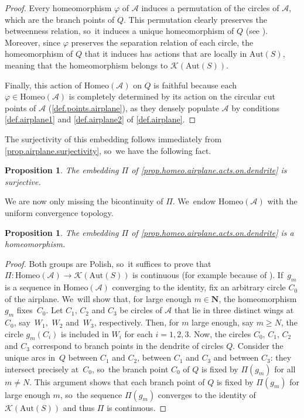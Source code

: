 \documentclass[JEP,XML,SOM,Unicode,NoFloatCountersInSection,published]{cedram}
\theoremstyle{plain}
\newtheorem{proposition}[theorem]{Proposition}
\theoremstyle{definition}
\theoremstyle{remark}
\newcommand{\Aut}{\mathrm{Aut}}
\newcommand{\Homeo}{\mathrm{Homeo}}
\newcommand{\A}{\mathcal{A}}
\newcommand{\K}{\mathcal{K}}
\begin{document}
\begin{proof}
Every homeomorphism $\varphi$ of $\A$ induces a permutation of the circles of $\A$, which are the branch points of $Q$.
This permutation clearly preserves the betweenness relation, so~it induces a unique homeomorphism of $Q$ (see \cite[Prop.\,2.4]{Kaleidoscopic}).
Moreover, since $\varphi$ preserves the separation relation of each circle, the homeomorphism of $Q$ that it induces has actions that are locally in $\Aut(S)$, meaning that the homeomorphism belongs to $\K(\Aut(S))$.

Finally, this action of $\Homeo(\A)$ on $Q$ is faithful because each $\varphi \in \Homeo(\A)$ is completely determined by its action on the circular cut points of $\A$ (\cref{def.points.airplane}), as they densely populate $\A$ by conditions \cref{def.airplane1} and  \cref{def.airplane2} of \cref{def.airplane}.
\end{proof}

The surjectivity of this embedding follows immediately from \cref{prop.airplane.surjectivity}, so~we have the following fact.

\begin{proposition}
\label{prop.airplane.embedding.is.surjective}
The embedding $\Pi$ of \cref{prop.homeo.airplane.acts.on.dendrite} is surjective.
\end{proposition}

We are now only missing the bicontinuity of $\Pi$. We~endow $\Homeo(\A)$ with the uniform convergence topology.

\begin{proposition}
\label{prop.airplane.embedding.is.continuous}
The embedding $\Pi$ of \cref{prop.homeo.airplane.acts.on.dendrite} is a homeomorphism.
\end{proposition}

\begin{proof}
Both groups are Polish, so~it suffices to prove that $\Pi \colon \Homeo(\A) \to \K(\Aut(S))$ is continuous (for example because of \cite[Cor.\,2.3.4]{MR2455198}). If~$g_m$ is a sequence in $\Homeo(\A)$ converging to the identity, fix an arbitrary circle $C_0$ of the airplane. We~will show that, for large enough $m \in \mathbf{N}$, the homeomorphism $g_m$ fixes~$C_0$.
Let $C_1$, $C_2$ and $C_3$ be circles of $\A$ that lie in three distinct wings at $C_0$, say~$W_1$,~$W_2$ and~$W_3$, respectively.
Then, for $m$ large enough, say $m \geq N$, the circle $g_m(C_i)$ is included in $W_i$ for each $i = 1,2,3$.
Now, the circles $C_0$, $C_1$, $C_2$ and $C_3$ correspond to branch points in the dendrite of circles $Q$.
Consider the unique arcs in~$Q$ between $C_1$ and $C_2$, between $C_1$ and $C_3$ and between $C_3$:
they intersect precisely at~$C_0$, so~the branch point $C_0$ of $Q$ is fixed by $\Pi(g_m)$ for all $m \neq N$.
This argument shows that each branch point of $Q$ is fixed by $\Pi(g_m)$ for large enough $m$, so~the sequence $\Pi(g_m)$ converges to the identity of $\K(\Aut(S))$ and thus $\Pi$ is continuous.
\end{proof}
\end{document}

